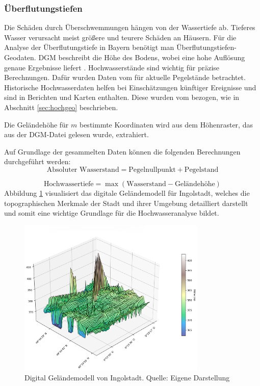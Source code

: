 \subsubsection{Überflutungstiefen}\label{sec:tief}
Die Schäden durch Überschwemmungen hängen von der Wassertiefe ab. Tieferes Wasser verursacht meist größere und teurere Schäden an Häusern. Für die Analyse der Überflutungstiefe in Bayern benötigt man Überflutungstiefen-Geodaten. \ac{DGM} beschreibt die Höhe des Bodens, wobei eine hohe Auflösung genaue Ergebnisse liefert \parencite{vermessungsverwaltung2019gelandemodell}. Hochwasserstände sind wichtig für präzise Berechnungen. Dafür wurden Daten vom \textcite{bayern2016hochwassernachrichtendienst} für aktuelle Pegelstände betrachtet. Historische Hochwasserdaten helfen bei Einschätzungen künftiger Ereignisse und sind in Berichten und Karten enthalten. Diese wurden vom \textcite{LfU_Bayern} bezogen, wie in Abschnitt \ref{sec:hochgeo} beschrieben.

Die Geländehöhe  für $m$ bestimmte Koordinaten wird aus dem Höhenraster, das aus der \ac{DGM}-Datei gelesen wurde, extrahiert.

Auf Grundlage der gesammelten Daten können die folgenden Berechnungen durchgeführt werden:
\begin{equation}
    \text{Absoluter Wasserstand} = \text{Pegelnullpunkt} + \text{Pegelstand}
\end{equation}

\begin{equation}
    \text{Hochwassertiefe} = \max \left( \text{Wasserstand} - \text{Geländehöhe} \right)
\end{equation}
 Abbildung \ref{fig:ingolstadt} visualisiert das digitale Geländemodell für Ingolstadt, welches die topographischen Merkmale der Stadt und ihrer Umgebung detailliert darstellt und somit eine wichtige Grundlage für die Hochwasseranalyse bildet.
\begin{figure}[!ht]
    \centering
    \includegraphics[width=0.8\textwidth]{figures/dgm_3d_wireframe_ingolstadt.png}
    \caption{Digital Geländemodell von Ingolstadt. Quelle: Eigene Darstellung}
    \label{fig:ingolstadt}
\end{figure}
\FloatBarrier